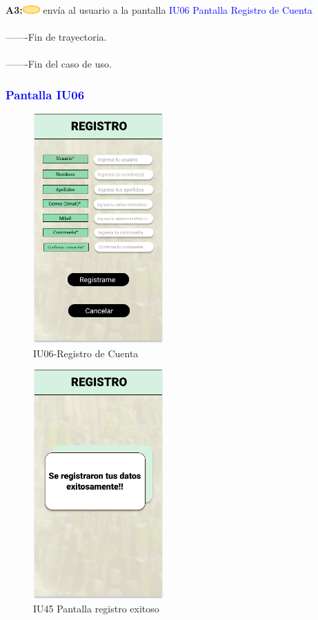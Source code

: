                         \textbf{A3:}\includegraphics[width=0.0500\textwidth]{Figuras/sistema.png} envía al usuario a la pantalla \textcolor{blue}{IU06 Pantalla Registro de Cuenta} \\\\
                       
        -------Fin de  trayectoria. \\\\
         -------Fin del caso de uso. \\

\subsubsection{\textcolor{blue}{Pantalla IU06}}
\begin{figure}[htbp]
        \centering
        \includegraphics[width= 5cm]{Pantallas Prototipo3/IU06-Registro de Cuenta.jpg}
        \caption{IU06-Registro de Cuenta}
        \label{fig:enter-label}
\end{figure}
\begin{figure}[htbp]
    \centering
    \includegraphics[width= 5cm]{Pantallas Prototipo3/IU45 Pantalla registro exitoso.jpg}
    \caption{IU45 Pantalla registro exitoso}
    \label{fig:enter-label}
\end{figure}

